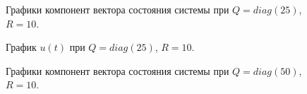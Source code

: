 \begin{figure}[!h]
	\caption{Графики компонент вектора состояния системы при $Q=diag(25)$, $R=10$.}
	\label{6_2_Q_25_R_10_x}
\end{figure}

\begin{figure}[!h]
	\caption{График $u(t)$ при $Q=diag(25)$, $R=10$.}
	\label{6_2_Q_25_R_10_u}
\end{figure}


\begin{figure}[!h]
	\caption{Графики компонент вектора состояния системы при $Q=diag(50)$, $R=10$.}
	\label{6_2_Q_50_R_10_x}
\end{figure}

